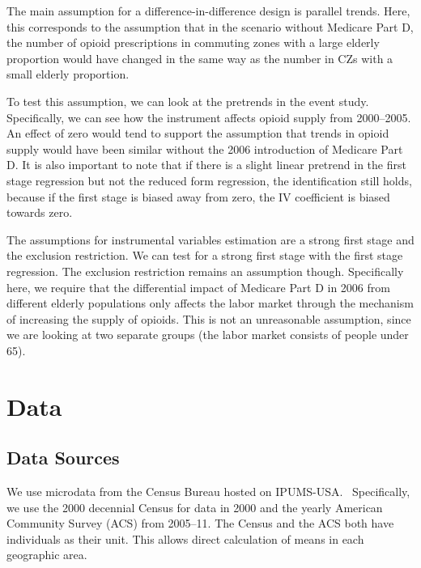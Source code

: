 \documentclass[12pt]{article}
\begin{document}
The main assumption for a difference-in-difference design is parallel trends.  Here, this corresponds to the assumption that in the scenario without Medicare Part D, the number of opioid prescriptions in commuting zones with a large elderly proportion would have changed in the same way as the number in CZs with a small elderly proportion.

To test this assumption, we can look at the pretrends in the event study.  Specifically, we can see how the instrument affects opioid supply from 2000--2005.  An effect of zero would tend to support the assumption that trends in opioid supply would have been similar without the 2006 introduction of Medicare Part D.  It is also important to note that if there is a slight linear pretrend in the first stage regression but not the reduced form regression, the identification still holds, because if the first stage is biased away from zero, the IV coefficient is biased towards zero.

The assumptions for instrumental variables estimation are a strong first stage and the exclusion restriction.  We can test for a strong first stage with the first stage regression.  The exclusion restriction remains an assumption though.  Specifically here, we require that the differential impact of Medicare Part D in 2006 from different elderly populations only affects the labor market through the mechanism of increasing the supply of opioids.  This is not an unreasonable assumption, since we are looking at two separate groups (the labor market consists of people under 65).  

\section{Data} \label{data}
\subsection{Data Sources}
We use microdata from the Census Bureau hosted on IPUMS-USA.~  Specifically, we use the 2000 decennial Census for data in 2000 and the yearly American Community Survey (ACS) from 2005--11.  The Census and the ACS both have individuals as their unit.  This allows direct calculation of means in each geographic area.
\end{document}
